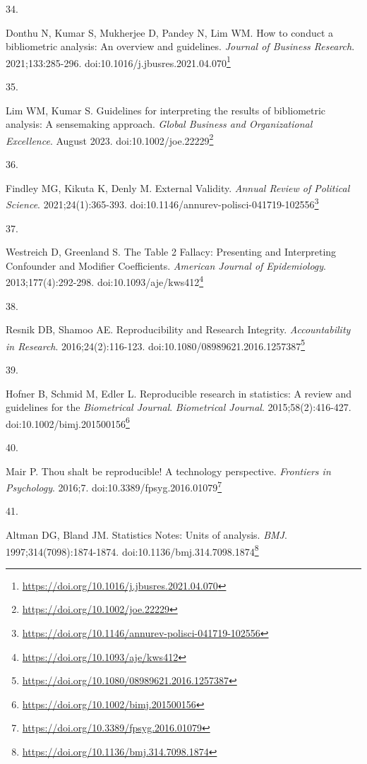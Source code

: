 \documentclass[
  a4paper,
]{book}
\newlength{\cslhangindent}
\newlength{\csllabelwidth}
\newlength{\cslentryspacingunit} %
\newenvironment{CSLReferences}[2] %
 {%
  \setlength{\parindent}{0pt}
  \ifodd #1
  \let\oldpar\par
  \def\par{\hangindent=\cslhangindent\oldpar}
  \fi
  \setlength{\parskip}{#2\cslentryspacingunit}
 }%
 {}
\newcommand{\CSLLeftMargin}[1]{\parbox[t]{\csllabelwidth}{#1}}
\newcommand{\CSLRightInline}[1]{\parbox[t]{\linewidth - \csllabelwidth}{#1}\break}
\renewcommand{\href}[2]{#2\footnote{\url{#1}}}
\begin{document}
\begin{CSLReferences}{0}{0}
\leavevmode{}%
\CSLLeftMargin{34. }%
\CSLRightInline{Donthu N, Kumar S, Mukherjee D, Pandey N, Lim WM. How to conduct a bibliometric analysis: An overview and guidelines. \emph{Journal of Business Research}. 2021;133:285-296. doi:\href{https://doi.org/10.1016/j.jbusres.2021.04.070}{10.1016/j.jbusres.2021.04.070}}

\leavevmode{}%
\CSLLeftMargin{35. }%
\CSLRightInline{Lim WM, Kumar S. Guidelines for interpreting the results of bibliometric analysis: A sensemaking approach. \emph{Global Business and Organizational Excellence}. August 2023. doi:\href{https://doi.org/10.1002/joe.22229}{10.1002/joe.22229}}

\leavevmode{}%
\CSLLeftMargin{36. }%
\CSLRightInline{Findley MG, Kikuta K, Denly M. External Validity. \emph{Annual Review of Political Science}. 2021;24(1):365-393. doi:\href{https://doi.org/10.1146/annurev-polisci-041719-102556}{10.1146/annurev-polisci-041719-102556}}

\leavevmode{}%
\CSLLeftMargin{37. }%
\CSLRightInline{Westreich D, Greenland S. The Table 2 Fallacy: Presenting and Interpreting Confounder and Modifier Coefficients. \emph{American Journal of Epidemiology}. 2013;177(4):292-298. doi:\href{https://doi.org/10.1093/aje/kws412}{10.1093/aje/kws412}}

\leavevmode{}%
\CSLLeftMargin{38. }%
\CSLRightInline{Resnik DB, Shamoo AE. Reproducibility and Research Integrity. \emph{Accountability in Research}. 2016;24(2):116-123. doi:\href{https://doi.org/10.1080/08989621.2016.1257387}{10.1080/08989621.2016.1257387}}

\leavevmode{}%
\CSLLeftMargin{39. }%
\CSLRightInline{Hofner B, Schmid M, Edler L. Reproducible research in statistics: A review and guidelines for the {\emph{Biometrical Journal}}. \emph{Biometrical Journal}. 2015;58(2):416-427. doi:\href{https://doi.org/10.1002/bimj.201500156}{10.1002/bimj.201500156}}

\leavevmode{}%
\CSLLeftMargin{40. }%
\CSLRightInline{Mair P. Thou shalt be reproducible! A technology perspective. \emph{Frontiers in Psychology}. 2016;7. doi:\href{https://doi.org/10.3389/fpsyg.2016.01079}{10.3389/fpsyg.2016.01079}}

\leavevmode{}%
\CSLLeftMargin{41. }%
\CSLRightInline{Altman DG, Bland JM. Statistics Notes: Units of analysis. \emph{BMJ}. 1997;314(7098):1874-1874. doi:\href{https://doi.org/10.1136/bmj.314.7098.1874}{10.1136/bmj.314.7098.1874}}


\end{CSLReferences}
\end{document}
